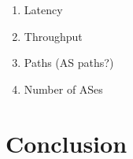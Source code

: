 \documentclass{sig-alternate-10pt}
\begin{document}
\begin{enumerate}
\item Latency
\item Throughput
\item Paths (AS paths?)
\item Number of ASes
\end{enumerate}


\section{Conclusion}




\end{document}
